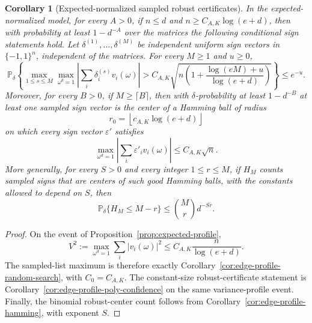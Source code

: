 \documentclass[11pt]{amsart}
\numberwithin{equation}{section}
\newtheorem{corollary}[theorem]{Corollary}
\theoremstyle{definition}
\theoremstyle{remark}
\newcommand{\Prob}{\mathbb P}
\newcommand{\eps}{\varepsilon}
\begin{document}
\begin{corollary}[Expected-normalized sampled robust certificates]
\label{cor:expected-sampled-robust-certificates}
In the expected-normalized model, for every \(A>0\), if \(n\le d\) and
\(n\ge C_{A,K}\log(e+d)\), then with probability at least \(1-d^{-A}\) over
the matrices the following conditional sign statements hold.  Let
\(\delta^{(1)},\ldots,\delta^{(M)}\) be independent uniform sign vectors in
\(\{-1,1\}^n\), independent of the matrices.  For every \(M\ge1\) and \(u\ge0\),
\[
  \Prob_\delta\left\{
  \max_{1\le s\le M}\max_{\omega^d=1}
  \left|\sum_i\delta_i^{(s)}v_i(\omega)\right|
  >
  C_{A,K}\sqrt{
    n\left(1+\frac{\log(eM)+u}{\log(e+d)}\right)}
  \right\}\le e^{-u}.
\]
Moreover, for every \(B>0\), if \(M\ge\lceil B\rceil\), then with
\(\delta\)-probability at least \(1-d^{-B}\) at least one sampled sign vector is
the center of a Hamming ball of radius
\[
  r_0=\left\lfloor c_{A,K}\log(e+d)\right\rfloor
\]
on which every sign vector \(\eps'\) satisfies
\[
  \max_{\omega^d=1}
  \left|\sum_i\eps'_i v_i(\omega)\right|
  \le C_{A,K}\sqrt n .
\]
More generally, for every \(S>0\) and every integer \(1\le r\le M\), if
\(H_M\) counts sampled signs that are centers of such good Hamming balls, with
the constants allowed to depend on \(S\), then
\[
  \Prob_\delta\{H_M\le M-r\}\le \binom Mr d^{-Sr}.
\]
\end{corollary}

\begin{proof}
On the event of Proposition~\ref{prop:expected-profile},
\[
  V^2:=\max_{\omega^d=1}\sum_i |v_i(\omega)|^2
  \le C_{A,K}\frac n{\log(e+d)} .
\]
The sampled-list maximum is therefore exactly
Corollary~\ref{cor:edge-profile-random-search}, with
\(C_0=C_{A,K}\).  The constant-size robust-certificate statement is
Corollary~\ref{cor:edge-profile-poly-confidence} on the same variance-profile
event.  Finally, the binomial robust-center count follows from
Corollary~\ref{cor:edge-profile-hamming}, with exponent \(S\).
\end{proof}
\end{document}
